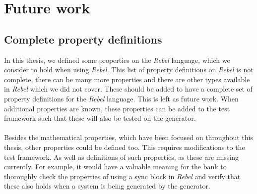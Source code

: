 \section{Future work}

\subsection*{Complete property definitions}
In this thesis, we defined some properties on the \textit{Rebel} language,
which we consider to hold when using \textit{Rebel}. This list of property
definitions on \textit{Rebel} is not complete, there can be many more properties
and there are other types available in \textit{Rebel} which we did not cover.
These should be added to have a complete set of property definitions for the
\textit{Rebel} language. This is left as future work. When additional properties
are known, these properties can be added to the test framework such that these
will also be tested on the generator.\\
\\
Besides the mathematical properties, which have been focused on throughout this
thesis, other properties could be defined too. This requires modifications to
the test framework. As well as definitions of such properties, as these are
missing currently. For example, it would have a valuable meaning for the bank to
thoroughly check the properties of using a sync block in \textit{Rebel} and
verify that these also holds when a system is being generated by the generator.

